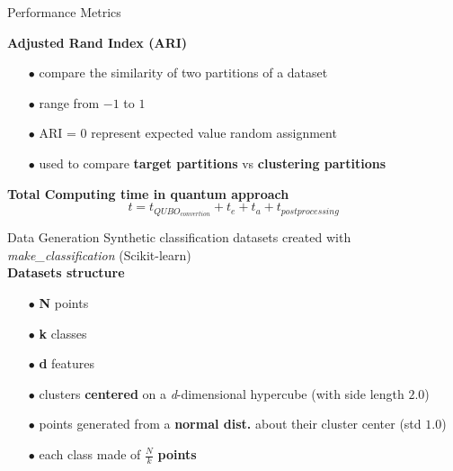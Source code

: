 		\begin{frame}{Performance Metrics}
						
			\textbf{Adjusted Rand Index (ARI)}
			\begin{itemize}
				\item[$\bullet$] compare the similarity of two partitions of a dataset 
				\item[$\bullet$] range from $-1$ to $1$ 
				\item[$\bullet$] ARI = 0 represent expected value random assignment
				\item[$\bullet$] used to compare \textbf{target partitions} vs \textbf{clustering partitions} 
			\end{itemize}
			
			\textbf{Total Computing time in quantum approach}
			\begin{equation}
				t = t_{QUBO_{convertion}} + t_{e} + t_{a} + t_{postprocessing}
			\end{equation}

		
		\end{frame}

		\begin{frame}{Data Generation}
			Synthetic classification datasets created with \textit{make\_classification} (Scikit-learn)	\\
			\textbf{Datasets structure}
			\begin{itemize}
				\item[$\bullet$] \textbf{N} points	
				\item[$\bullet$] \textbf{k} classes	
				\item[$\bullet$] \textbf{d} features 
				\item[$\bullet$] clusters \textbf{centered} on a \textit{d}-dimensional hypercube (with side length $2.0$)  
				\item[$\bullet$] points generated from a \textbf{normal dist.} about their cluster center (std $1.0$)   
				\item[$\bullet$] each class made of $\frac{N}{k}$ \textbf{points}   
			\end{itemize}

			
		\end{frame}

